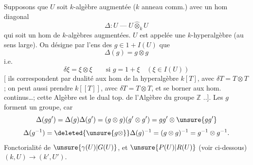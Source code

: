 
Supposons que $U$ soit   $k$-algèbre
augmentée ($k$ anneau comm.) avec un
hom diagonal
\[
\Delta:U\;\text{---}\;U\widehat\otimes_k U
\]
qui soit un hom de $k$-algèbres augmentées.
$U$ est appelée une $k$-hyperalgèbre  (au sens
large). On désigne par
 
 l'ens
des $g\in1+I(U)$   que
\[
\Delta(g)=g\otimes g
\]
i.e.
\[
\delta\xi=\xi\otimes\xi\qquad\text{si }g=1+\xi\quad(\xi\in I(U))
\]
[ ils correspondent par dualité aux
hom de la hyperalgèbre 
$k[T]$, avec $\delta T=T\otimes T$ ; on peut aussi
prendre $k[[T]]$, avec $\delta T=T\otimes T$, et
se borner aux hom. continus\ldots ;
cette Algèbre est le dual top. de
l'Algèbre du groupe $\mathbb Z$ ..].  Les
$g$ forment un groupe, car
\[
\Delta(gg')=\Delta(g)\Delta(g')=(g\otimes g)(g'\otimes g')
=gg'\otimes\unsure{gg'}
\]
\[
\Delta(g^{-1})=\deleted{\unsure{g\otimes}}\Delta(g)^{-1}
=(g\otimes g)^{-1}=g^{-1}\otimes g^{-1}.
\]
Fonctorialité de $\unsure{\gamma(U)|G(U)}$, et $\unsure{P(U)|R(U)}$
(voir ci-dessous)
 
$(k,U)\longrightarrow(k',U')$.

